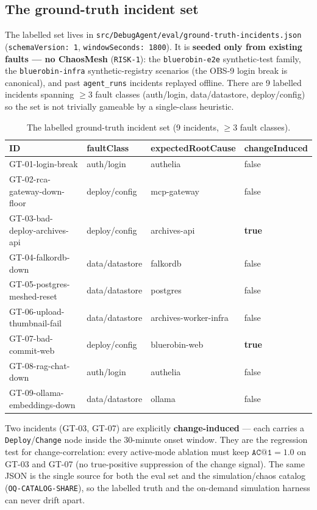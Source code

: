 \documentclass[11pt]{article}
\makeatletter
\newcommand{\acone}{\texttt{AC@1}}
\newcommand{\code}[1]{\texttt{#1}}
\makeatother
\begin{document}
\subsection{The ground-truth incident set}
\label{sec:groundtruth}

The labelled set lives in \code{src/DebugAgent/eval/ground-truth-incidents.json}
(\code{schemaVersion: 1}, \code{windowSeconds: 1800}). It is \textbf{seeded only from
existing faults --- no ChaosMesh} (\code{RISK-1}): the \code{bluerobin-e2e} synthetic-test
family, the \code{bluerobin-infra} synthetic-registry scenarios (the OBS-9 login break is
canonical), and past \code{agent\_runs} incidents replayed offline. There are 9 labelled
incidents spanning $\ge 3$ fault classes (auth/login, data/datastore, deploy/config) so the
set is not trivially gameable by a single-class heuristic.

\begin{table}[h]
\centering
\caption{The labelled ground-truth incident set (9 incidents, $\ge 3$ fault classes).}
\label{tab:groundtruth}
\begin{tabular}{llll}
\toprule
ID & faultClass & expectedRootCause & changeInduced \\
\midrule
GT-01-login-break          & auth/login    & authelia              & false \\
GT-02-rca-gateway-down-floor & deploy/config & mcp-gateway         & false \\
GT-03-bad-deploy-archives-api & deploy/config & archives-api       & \textbf{true} \\
GT-04-falkordb-down        & data/datastore & falkordb             & false \\
GT-05-postgres-meshed-reset & data/datastore & postgres            & false \\
GT-06-upload-thumbnail-fail & data/datastore & archives-worker-infra & false \\
GT-07-bad-commit-web       & deploy/config & bluerobin-web         & \textbf{true} \\
GT-08-rag-chat-down        & auth/login    & authelia              & false \\
GT-09-ollama-embeddings-down & data/datastore & ollama             & false \\
\bottomrule
\end{tabular}
\end{table}

Two incidents (GT-03, GT-07) are explicitly \textbf{change-induced} --- each carries a
\code{Deploy}/\code{Change} node inside the 30-minute onset window. They are the regression
test for change-correlation: every active-mode ablation must keep $\acone{} = 1.0$ on GT-03
and GT-07 (no true-positive suppression of the change signal). The same JSON is the single
source for both the eval set and the simulation/chaos catalog (\code{OQ-CATALOG-SHARE}), so
the labelled truth and the on-demand simulation harness can never drift apart.
\end{document}
